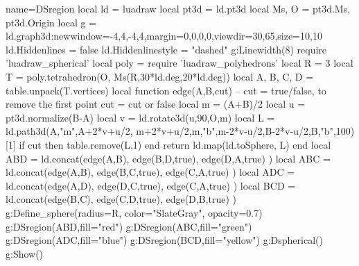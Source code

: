 \begin{luadraw}{name=DSregion}
local ld = luadraw
local pt3d = ld.pt3d
local Ms, O = pt3d.Ms, pt3d.Origin
local g = ld.graph3d:new{window={-4,4,-4,4},margin={0,0,0,0},viewdir={30,65},size={10,10}}
ld.Hiddenlines = false
ld.Hiddenlinestyle = "dashed"
g:Linewidth(8)
require 'luadraw_spherical'
local poly = require 'luadraw_polyhedrons'
local R = 3
local T = poly.tetrahedron(O, Ms(R,30*ld.deg,20*ld.deg))
local A, B, C, D = table.unpack(T.vertices)
local function edge(A,B,cut) -- cut = true/false, to remove the first point
    cut = cut or false
    local m = (A+B)/2
    local u = pt3d.normalize(B-A)
    local v = ld.rotate3d(u,90,{O,m})
    local L = ld.path3d({A,"m",A+2*v+u/2, m+2*v+u/2,m,"b",m-2*v-u/2,B-2*v-u/2,B,"b"},100)[1]
    if cut then table.remove(L,1) end
    return ld.map(ld.toSphere, L)
end
local ABD = ld.concat(edge(A,B), edge(B,D,true), edge(D,A,true) )
local ABC = ld.concat(edge(A,B), edge(B,C,true), edge(C,A,true) )
local ADC = ld.concat(edge(A,D), edge(D,C,true), edge(C,A,true) )
local BCD = ld.concat(edge(B,C), edge(C,D,true), edge(D,B,true) )
g:Define_sphere({radius=R, color="SlateGray", opacity=0.7})
g:DSregion(ABD,{fill="red"})
g:DSregion(ABC,{fill="green"})
g:DSregion(ADC,{fill="blue"})
g:DSregion(BCD,{fill="yellow"})
g:Dspherical()
g:Show()
\end{luadraw}
